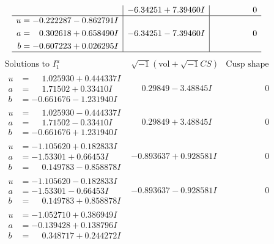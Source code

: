 \documentclass[1p]{elsarticle_modified}
\theoremstyle{definition}
\newcommand{\I}{\sqrt{-1}}
\begin{document}
$$\begin{array}{c|c|c}
 & -6.34251 + 7.39460 I & \phantom{-0.000000 } 0 \\ \hline\begin{aligned}
u &= -0.222287 - 0.862791 I \\
a &= \phantom{-}0.302618 + 0.658490 I \\
b &= -0.607223 + 0.026295 I\end{aligned}
 & -6.34251 - 7.39460 I & \phantom{-0.000000 } 0\\
 \hline 
 \end{array}$$\newpage$$\begin{array}{c|c|c}  
\text{Solutions to }I^u_{1}& \I (\text{vol} + \sqrt{-1}CS) & \text{Cusp shape}\\
 \hline 
\begin{aligned}
u &= \phantom{-}1.025930 + 0.444337 I \\
a &= \phantom{-}1.71502 + 0.33410 I \\
b &= -0.661676 - 1.231940 I\end{aligned}
 & \phantom{-}0.29849 - 3.48845 I & \phantom{-0.000000 } 0 \\ \hline\begin{aligned}
u &= \phantom{-}1.025930 - 0.444337 I \\
a &= \phantom{-}1.71502 - 0.33410 I \\
b &= -0.661676 + 1.231940 I\end{aligned}
 & \phantom{-}0.29849 + 3.48845 I & \phantom{-0.000000 } 0 \\ \hline\begin{aligned}
u &= -1.105620 + 0.182833 I \\
a &= -1.53301 + 0.66453 I \\
b &= \phantom{-}0.149783 - 0.858878 I\end{aligned}
 & -0.893637 + 0.928581 I & \phantom{-0.000000 } 0 \\ \hline\begin{aligned}
u &= -1.105620 - 0.182833 I \\
a &= -1.53301 - 0.66453 I \\
b &= \phantom{-}0.149783 + 0.858878 I\end{aligned}
 & -0.893637 - 0.928581 I & \phantom{-0.000000 } 0 \\ \hline\begin{aligned}
u &= -1.052710 + 0.386949 I \\
a &= -0.139428 + 0.138796 I \\
b &= \phantom{-}0.348717 + 0.244272 I\end{aligned}

\end{array}$$
\end{document}
